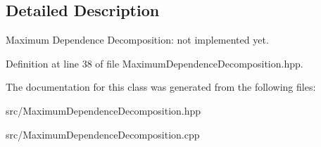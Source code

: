 \subsection{Detailed Description}
Maximum Dependence Decomposition\+: not implemented yet. 

Definition at line 38 of file Maximum\+Dependence\+Decomposition.\+hpp.



The documentation for this class was generated from the following files\+:\begin{DoxyCompactItemize}
\item 
src/Maximum\+Dependence\+Decomposition.\+hpp\item 
src/Maximum\+Dependence\+Decomposition.\+cpp\end{DoxyCompactItemize}
